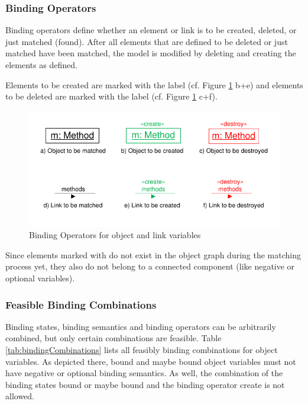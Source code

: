 \subsubsection{Binding Operators}
\label{sec:StoryPatterns:binding:operators}
Binding operators define whether an element or link is to be created, deleted,
or just matched (found).
After all elements that are defined to be deleted or just matched have been
matched, the model is modified by deleting and creating the elements as
defined.

Elements to be created are marked with the
label \create (cf. Figure \ref{fig:bindingOperatorsOverview} b+e) and elements
to be deleted are marked with the label \destroy (cf. Figure
\ref{fig:bindingOperatorsOverview} c+f).

\begin{figure}[htbp]
  \centering
  \includegraphics[scale=1.2]{figures/BindingOperatorsOverview}
  \caption{Binding Operators for object and link variables}
  \label{fig:bindingOperatorsOverview}
\end{figure}

Since elements marked with \create do not exist in the object graph during the
matching process yet, they also do not belong to a connected component (like
negative or optional variables).


\subsubsection{Feasible Binding Combinations}

Binding states, binding semantics and binding operators can be
arbitrarily combined, but only certain combinations are feasible. 
Table \ref{tab:bindingCombinations} lists all feasibly binding combinations for
object variables. As depicted there, bound and maybe bound object variables must not have negative
or optional binding semantics. As well, the combination of the binding states
bound or maybe bound and the binding operator create is not allowed.

